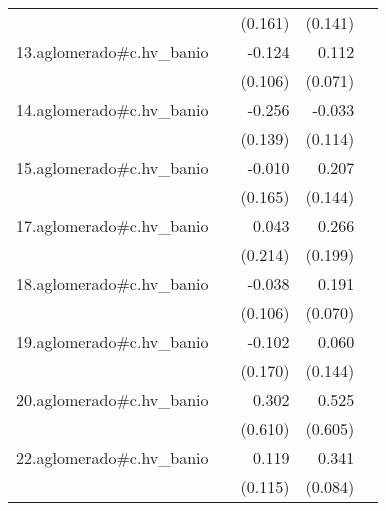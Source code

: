 {\begin{longtable}{l*{4}{D{.}{.}{-1}}}
            &                     &     (0.161)         &     (0.141)         &                     \\
\addlinespace
13.aglomerado#c.hv\_banio&                     &      -0.124         &       0.112         &                     \\
            &                     &     (0.106)         &     (0.071)         &                     \\
\addlinespace
14.aglomerado#c.hv\_banio&                     &      -0.256         &      -0.033         &                     \\
            &                     &     (0.139)         &     (0.114)         &                     \\
\addlinespace
15.aglomerado#c.hv\_banio&                     &      -0.010         &       0.207         &                     \\
            &                     &     (0.165)         &     (0.144)         &                     \\
\addlinespace
17.aglomerado#c.hv\_banio&                     &       0.043         &       0.266         &                     \\
            &                     &     (0.214)         &     (0.199)         &                     \\
\addlinespace
18.aglomerado#c.hv\_banio&                     &      -0.038         &       0.191\sym{**} &                     \\
            &                     &     (0.106)         &     (0.070)         &                     \\
\addlinespace
19.aglomerado#c.hv\_banio&                     &      -0.102         &       0.060         &                     \\
            &                     &     (0.170)         &     (0.144)         &                     \\
\addlinespace
20.aglomerado#c.hv\_banio&                     &       0.302         &       0.525         &                     \\
            &                     &     (0.610)         &     (0.605)         &                     \\
\addlinespace
22.aglomerado#c.hv\_banio&                     &       0.119         &       0.341\sym{***}&                     \\
            &                     &     (0.115)         &     (0.084)         &                     \\

\end{longtable}}
